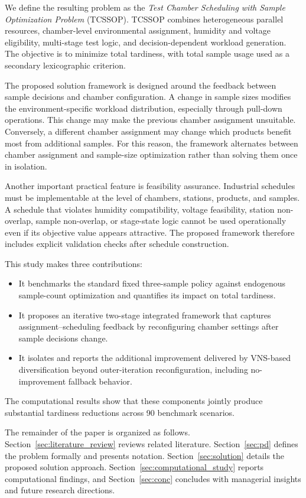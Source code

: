\documentclass[11pt]{article}
\begin{document}
We define the resulting problem as the \emph{Test Chamber Scheduling with Sample Optimization Problem} (TCSSOP). TCSSOP combines heterogeneous parallel resources, chamber-level environmental assignment, humidity and voltage eligibility, multi-stage test logic, and decision-dependent workload generation. The objective is to minimize total tardiness, with total sample usage used as a secondary lexicographic criterion.

The proposed solution framework is designed around the feedback between sample decisions and chamber configuration. A change in sample sizes modifies the environment-specific workload distribution, especially through pull-down operations. This change may make the previous chamber assignment unsuitable. Conversely, a different chamber assignment may change which products benefit most from additional samples. For this reason, the framework alternates between chamber assignment and sample-size optimization rather than solving them once in isolation.

Another important practical feature is feasibility assurance. Industrial schedules must be implementable at the level of chambers, stations, products, and samples. A schedule that violates humidity compatibility, voltage feasibility, station non-overlap, sample non-overlap, or stage-state logic cannot be used operationally even if its objective value appears attractive. The proposed framework therefore includes explicit validation checks after schedule construction.

This study makes three contributions:
\begin{itemize}
    \item It benchmarks the standard fixed three-sample policy against endogenous sample-count optimization and quantifies its impact on total tardiness.
    \item It proposes an iterative two-stage integrated framework that captures assignment--scheduling feedback by reconfiguring chamber settings after sample decisions change.
    \item It isolates and reports the additional improvement delivered by VNS-based diversification beyond outer-iteration reconfiguration, including no-improvement fallback behavior.
\end{itemize}
The computational results show that these components jointly produce substantial tardiness reductions across 90 benchmark scenarios.

The remainder of the paper is organized as follows. Section~\ref{sec:literature_review} reviews related literature. Section~\ref{sec:pd} defines the problem formally and presents notation. Section~\ref{sec:solution} details the proposed solution approach. Section~\ref{sec:computational_study} reports computational findings, and Section~\ref{sec:conc} concludes with managerial insights and future research directions.
\end{document}
